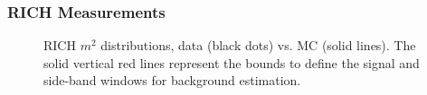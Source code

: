 \documentclass[%
aps, prd, reprint, show pacs, preprint numbers, ams math, amssymb, superscriptaddress, linenumbers]{revtex4-1}
\begin{document}
\subsubsection{RICH Measurements}
\begin{figure}[!htb] %
   \centering
   \caption{RICH $m^2$ distributions, data (black dots) vs. MC (solid lines).  The solid vertical red lines represent the bounds to define the signal and side-band windows for background estimation.}
   \label{fig:richm2A}
\end{figure}
   
\end{document}
